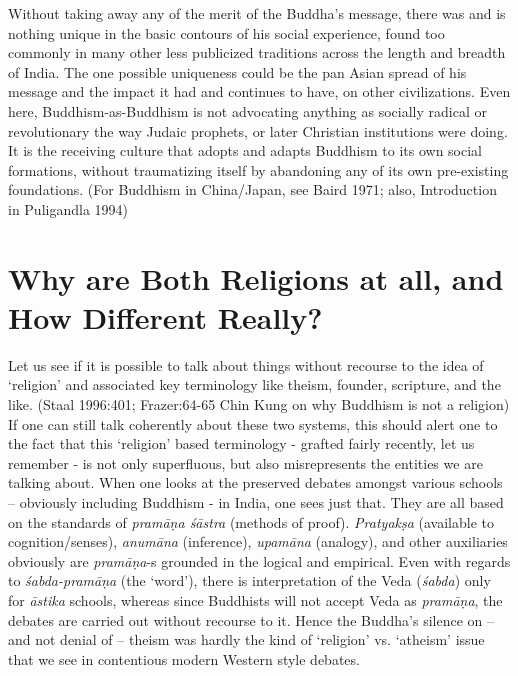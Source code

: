 Without taking away any of the merit of the Buddha’s message, there was and is nothing unique in the basic contours of his social experience, found too commonly in many other less publicized traditions across the length and breadth of India. The one possible uniqueness could be the pan Asian spread of his message and the impact it had and continues to have, on other civilizations. Even here, Buddhism-as-Buddhism is not advocating anything as socially radical or revolutionary the way Judaic prophets, or later Christian institutions were doing. It is the receiving culture that adopts and adapts Buddhism to its own social formations, without traumatizing itself by abandoning any of its own pre-existing foundations. (For Buddhism in China/Japan, see Baird 1971; also, Introduction in Puligandla 1994)
 
\section*{Why are Both Religions at all, \hfill\break and How Different Really?}

Let us see if it is possible to talk about things without recourse to the idea of ‘religion’ and associated key terminology like theism, founder, scripture, and the like. (Staal 1996:401; Frazer:64-65 Chin Kung on why Buddhism is not a religion) If one can still talk coherently about these two systems, this should alert one to the fact that this ‘religion’ based terminology - grafted fairly recently, let us remember - is not only superfluous, but also misrepresents the entities we are talking about. When one looks at the preserved debates amongst various schools – obviously including Buddhism - in India, one sees just that. They are all based on the standards of \textit{pramāṇa śāstra} (methods of proof). \textit{Pratyakṣa} (available to cognition/senses), \textit{anumāna} (inference), \textit{upamāna} (analogy), and other auxiliaries obviously are \textit{pramāṇa}-s grounded in the logical and empirical. Even with regards to \textit{śabda-pramāṇa} (the ‘word’), there is interpretation of the Veda (\textit{śabda}) only for \textit{āstika} schools, whereas since Buddhists will not accept Veda as \textit{pramāṇa}, the debates are carried out without recourse to it. Hence the Buddha’s silence on – and not denial of – theism was hardly the kind of ‘religion’ vs. ‘atheism’ issue that we see in contentious modern Western style debates.


